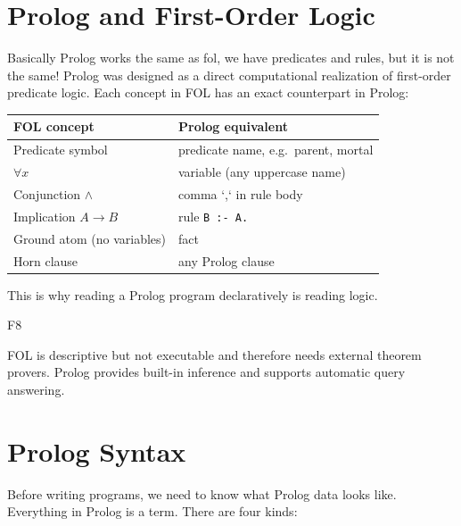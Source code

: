 \section{Prolog and First-Order Logic}
Basically Prolog works the same as fol, we have predicates and rules, but it is not the same!
Prolog was designed as a direct computational realization of first-order predicate logic. Each concept in FOL has an exact counterpart in Prolog:
\begin{table}[H]
    \centering
    \begin{tabular}{ll}
        \textbf{FOL concept} & \textbf{Prolog equivalent} \\
        \hline
        Predicate symbol & predicate name, e.g.\ parent, mortal \\
        $\forall x$ & variable (any uppercase name) \\
        Conjunction $\land$ & comma `,` in rule body \\
        Implication $A \rightarrow B$ & rule \texttt{B :- A.} \\
        Ground atom (no variables) & fact \\
        Horn clause & any Prolog clause \\
    \end{tabular}
\end{table}
This is why reading a Prolog program declaratively is reading logic.





\begin{bsp}
    F8 %
\end{bsp}

FOL is descriptive but not executable and therefore needs external theorem provers. Prolog provides built-in
inference and supports automatic query answering.


\section{Prolog Syntax}
Before writing programs, we need to know what Prolog data looks like. Everything in
Prolog is a term. There are four kinds:


